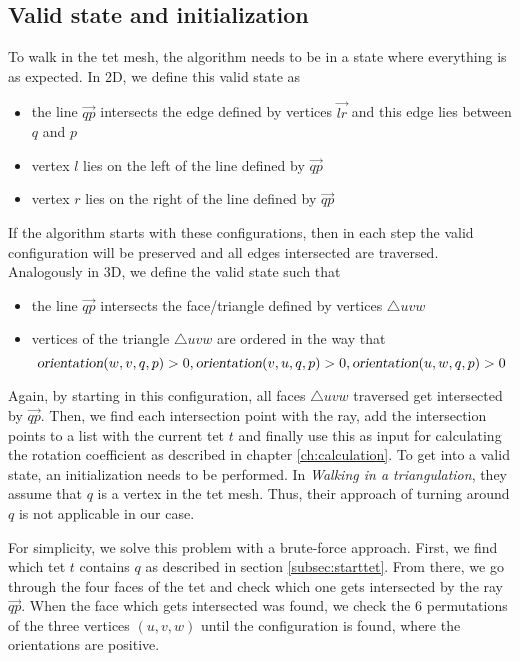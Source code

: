 \documentclass[../thesis.tex]{subfiles}
\begin{document}
\subsection{Valid state and initialization}\label{subsec:validstate}
To walk in the tet mesh, the algorithm needs to be in a state where everything is as expected.
In 2D, we define this valid state as
\begin{itemize}
  \item the line $\Vec{qp}$ intersects the edge defined by vertices $\Vec{lr}$ and this edge lies between $q$ and $p$
  \item vertex $l$ lies on the left of the line defined by $\Vec{qp}$
  \item vertex $r$ lies on the right of the line defined by $\Vec{qp}$
\end{itemize}
If the algorithm starts with these configurations, then in each step
the valid configuration will be preserved and all edges intersected are
traversed. 
Analogously in 3D, we define the valid state such that
\begin{itemize}
  \item the line $\Vec{qp}$ intersects the face/triangle defined by vertices $\triangle uvw$
  \item vertices of the triangle $\triangle uvw$ are ordered in the way that
  $$\textsl{orientation}(w,v,q,p)>0, \textsl{orientation}(v,u,q,p)>0, \textsl{orientation}(u,w,q,p)>0$$
\end{itemize}
Again, by starting in this configuration, all faces $\triangle uvw$
traversed get intersected by $\Vec{qp}$. Then, we find each
intersection point with the ray, add the intersection points to a list
with the current tet $t$ and finally use this as input for
calculating the rotation coefficient as described in chapter \ref{ch:calculation}.
To get into a valid state, an initialization needs to be performed.
In \emph{Walking in a triangulation}\cite{Devillers}, they assume that
$q$ is a vertex in the tet mesh. Thus, their approach of turning around $q$
is not applicable in our case.

For simplicity, we solve this problem with a brute-force approach.
First, we find which tet $t$ contains $q$ as described in section \ref{subsec:starttet}.
From there, we go through the four faces of the tet and check which
one gets intersected by the ray $\Vec{qp}$.
When the face which gets intersected was found,
we check the 6 permutations of the three vertices $(u,v,w)$
until the configuration is found, where the orientations are positive.
\end{document}
